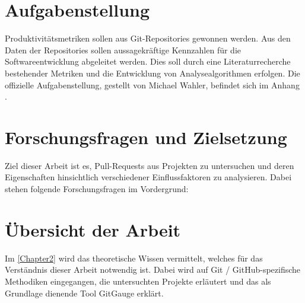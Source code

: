 \section{Aufgabenstellung}
Produktivitätsmetriken sollen aus Git-Repositories gewonnen werden. Aus den Daten der Repositories sollen aussagekräftige Kennzahlen für die Softwareentwicklung abgeleitet werden. Dies soll durch eine Literaturrecherche bestehender Metriken und die Entwicklung von Analysealgorithmen erfolgen.
Die offizielle Aufgabenstellung, gestellt von Michael Wahler, befindet sich im Anhang .
\newpage
\section{Forschungsfragen und Zielsetzung}
\label{sec:Zielsetzung}

Ziel dieser Arbeit ist es, Pull-Requests aus Projekten zu untersuchen und deren Eigenschaften hinsichtlich verschiedener Einflussfaktoren zu analysieren. Dabei stehen folgende Forschungsfragen im Vordergrund:








\section{Übersicht der Arbeit}
Im \autoref{Chapter2} \textit{} wird das theoretische Wissen vermittelt, welches für das Verständnis dieser Arbeit notwendig ist. Dabei wird auf  Git / GitHub-spezifische Methodiken eingegangen, die untersuchten Projekte erläutert und das als Grundlage dienende Tool GitGauge erklärt.

